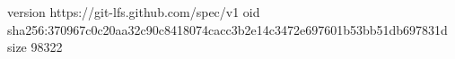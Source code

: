 version https://git-lfs.github.com/spec/v1
oid sha256:370967c0c20aa32c90c8418074cacc3b2e14c3472e697601b53bb51db697831d
size 98322
